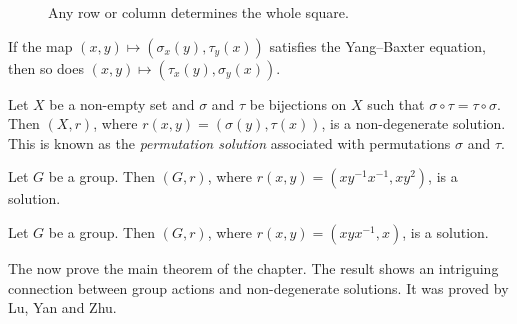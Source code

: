 \begin{figure}
\centering
{}
\caption{Any row or column determines the whole square.}
\label{fig:braid}
\end{figure}

\begin{example}
If the map $(x,y)\mapsto(\sigma_x(y),\tau_y(x))$ satisfies the Yang--Baxter equation, then 
so does $(x,y)\mapsto (\tau_x(y),\sigma_y(x))$. 
\end{example}

\begin{example}
\label{exa:Lyubashenko}
Let $X$ be a non-empty set and $\sigma$ and $\tau$ be 
bijections on $X$ such that $\sigma\circ\tau=\tau\circ\sigma$. Then 
$(X,r)$, where $r(x,y)=(\sigma(y),\tau(x))$, is a non-degenerate solution. 
This is known as the \emph{permutation solution} associated
with permutations $\sigma$ and $\tau$. 
\end{example}

\begin{example}
\label{exa:Wada}
Let $G$ be a group. Then $(G,r)$, where $r(x,y)=(xy^{-1}x^{-1},xy^2)$, is a solution. 
\end{example}

\begin{example}
\label{exa:Venkov}
Let $G$ be a group. Then $(G,r)$, where $r(x,y)=(xyx^{-1},x)$, is a solution. 
\end{example}

The now prove the main theorem of the chapter. The result
shows an intriguing connection between group actions and non-degenerate solutions. It 
was proved by Lu, Yan and Zhu. 

